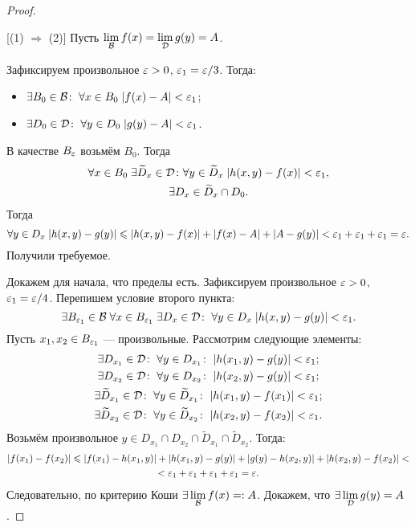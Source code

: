 \documentclass[a4paper, 12pt]{article}
\begin{document}
\begin{proof}\ 

    [(1) $\Rightarrow$ (2)] Пусть $\lim\limits_{\mathcal{B}} f(x) = \lim\limits_{\mathcal{D}} g(y) = A$. 
    \par Зафиксируем произвольное $\varepsilon > 0$, $\varepsilon_1 = \varepsilon/3$. Тогда:
    \begin{itemize}
        \item $\exists B_0\in \mathcal{B}\colon\; \forall x\in B_0\; |f(x) - A| <\varepsilon_1$;
        \item $\exists D_0\in \mathcal{D}\colon\; \forall y\in D_0\; |g(y) - A| <\varepsilon_1$.
    \end{itemize}
    В качестве $B_\varepsilon$ возьмём $B_0$. Тогда
    \begin{gather*}
        \forall x\in B_0\; \exists \widetilde{D}_x \in \mathcal{D}\colon \forall y \in \widetilde{D}_x\; |h(x,y) -f(x)| < \varepsilon_1,\\
        \exists D_x \in \widetilde{D}_x\cap D_0.
    \end{gather*}
    Тогда $$
    \forall y\in D_x\; |h(x,y) - g(y)| \leqslant |h(x,y) - f(x)| + |f(x) - A| + |A- g(y)| < \varepsilon_1 + \varepsilon_1 + \varepsilon_1 = \varepsilon.
    $$
    Получили требуемое.
    \par [$(2) \Rightarrow (1)$] Докажем для начала, что пределы есть. Зафиксируем произвольное $\varepsilon > 0$, $\varepsilon_1 = \varepsilon/4$. Перепишем условие второго пункта:
    $$
        \exists B_{\varepsilon_1} \in \mathcal{B}\; \forall x\in B_{\varepsilon_1}\; \exists D_x \in \mathcal{D}\colon\;  \forall y \in D_x \; |h(x,y) - g(y)| < \varepsilon_1.
    $$
    Пусть $x_1, x_2 \in B_{\varepsilon_1}$ --- произвольные. Рассмотрим следующие элементы:
    \begin{gather*}
        \exists D_{x_1} \in \mathcal{D}\colon \; \forall y\in D_{x_1}\colon \; |h(x_1,y) - g(y)|<\varepsilon_1;\\
        \exists D_{x_2}\in \mathcal{D}\colon \; \forall y \in D_{x_2}\colon \; |h(x_2, y) - g(y)| < \varepsilon_1;\\
        \exists \widetilde{D}_{x_1}\in \mathcal{D}\colon \; \forall y\in \widetilde{D}_{x_1}\colon \; |h(x_1,y) - f(x_1)| < \varepsilon_1;\\
        \exists \widetilde{D}_{x_2} \in \mathcal{D}\colon \; \forall y\in \widetilde{D}_{x_2}\colon \; |h(x_2,y) - f(x_2)| < \varepsilon_1.\\
    \end{gather*}
    Возьмём произвольное $y\in D_{x_1} \cap D_{x_2} \cap \widetilde{D}_{x_1}\cap \widetilde{D}_{x_2}$. Тогда:
    \begin{gather}
        |f(x_1) - f(x_2)| \leqslant |f(x_1) - h(x_1, y)| + |h(x_1, y) - g(y)| + |g(y) - h(x_2, y)| + |h(x_2, y) - f(x_2)|<\\ < \varepsilon_1 + \varepsilon_1 + \varepsilon_1 + \varepsilon_1 = \varepsilon.
    \end{gather}
    Следовательно, по критерию Коши $\exists \lim\limits_{\mathcal{B}} f(x) =: A$. Докажем, что $\exists \lim \limits_{\mathcal{D}} g(y) = A$. 
    

\end{proof}
\end{document}
